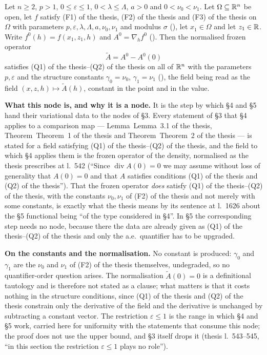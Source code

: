 \begin{lemma}
Let $n\ge2$, $p>1$, $0\le\varepsilon\le1$, $0<\lambda\le\Lambda$, $a>0$ and
$0<\nu_0<\nu_1$.  Let $\Omega\subseteq\mathbb{R}^n$ be open, let $f$ satisfy
(F1) of the thesis, (F2) of the thesis and (F3) of the thesis on $\Omega$ with parameters
$p,\varepsilon,\lambda,\Lambda,a,\nu_0,\nu_1$ and modulus $\sigma$
(), let $x_1\in\Omega$ and let $z_1\in\mathbb{R}$.
Write $f^0(h)=f(x_1,z_1,h)$ and $A^0=\nabla_hf^0$
().  Then the normalised frozen operator
\[
\widetilde A=A^0-A^0(0)
\]
satisfies (Q1) of the thesis--(Q2) of the thesis on all of $\mathbb{R}^n$ with the parameters
$p,\varepsilon$ and the structure constants $\gamma_0=\nu_0$,
$\gamma_1=\nu_1$ (), the field being read as the
field $(x,z,h)\mapsto\widetilde A(h)$, constant in the point and in the value.

\noindent\textbf{What this node is, and why it is a node.}  It is the step by
which \S4 and \S5 hand their variational data to the nodes of \S3.  Every
statement of \S3 that \S4 applies to a comparison map --- Lemma~Lemma~3.1 of the thesis,
Theorem~Theorem~1 of the thesis and Theorem~Theorem~2 of the thesis --- is stated for a field satisfying
(Q1) of the thesis--(Q2) of the thesis, and the field to which \S4 applies them is the
frozen operator of the density, normalised as the thesis prescribes at l.~542
(``Since $\operatorname{div}A(0)=0$ we may assume without loss of generality
that $A(0)=0$ and that $A$ satisfies conditions (Q1) of the thesis and
(Q2) of the thesis'').  That the frozen operator \emph{does} satisfy
(Q1) of the thesis--(Q2) of the thesis, with the constants $\nu_0,\nu_1$ of (F2) of the thesis
and not merely with some constants, is exactly what the thesis means by its
sentence at l.~1626 about the \S5 functional being ``of the type considered in
\S4''.  In \S5 the corresponding step needs no node, because there the data are
already given as (Q1) of the thesis--(Q2) of the thesis and only the a.e.\ quantifier has
to be upgraded.

\noindent\textbf{On the constants and the normalisation.}  No constant is
produced: $\gamma_0$ and $\gamma_1$ are the $\nu_0$ and $\nu_1$ of
(F2) of the thesis themselves, undegraded, so no quantifier-order question arises.
The normalisation $\widetilde A(0)=0$ is a definitional tautology and is
therefore not stated as a clause; what matters is that it costs nothing in the
structure conditions, since (Q1) of the thesis and (Q2) of the thesis constrain only the
derivative of the field and the derivative is unchanged by subtracting a
constant vector.  The restriction $\varepsilon\le1$ is the range in which \S4
and \S5 work, carried here for uniformity with the statements that consume this
node; the proof does not use the upper bound, and \S3 itself drops it (thesis
l.~543--545, ``in this section the restriction $\varepsilon\le1$ plays no
role'').
\end{lemma}
